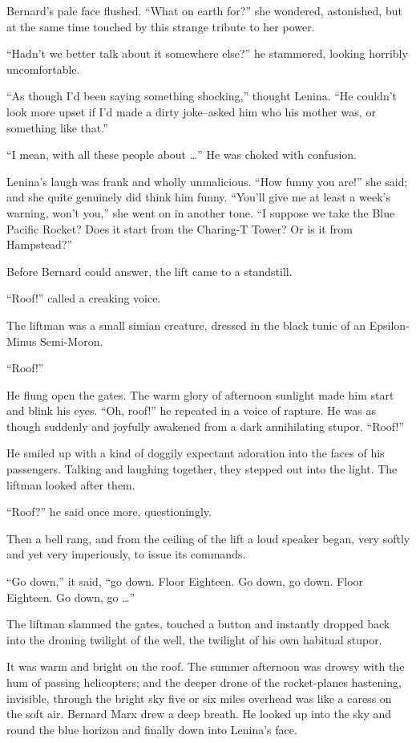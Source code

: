 \documentclass[12pt]{report}
\begin{document}
Bernard's pale face flushed. ``What on earth for?'' she wondered,
astonished, but at the same time touched by this strange tribute to her
power.

``Hadn't we better talk about it somewhere else?'' he stammered, looking
horribly uncomfortable.

``As though I'd been saying something shocking,'' thought Lenina. ``He
couldn't look more upset if I'd made a dirty joke--asked him who his
mother was, or something like that.''

``I mean, with all these people about \ldots{}'' He was choked with
confusion.

Lenina's laugh was frank and wholly unmalicious. ``How funny you are!''
she said; and she quite genuinely did think him funny. ``You'll give me
at least a week's warning, won't you,'' she went on in another tone. ``I
suppose we take the Blue Pacific Rocket? Does it start from the
Charing-T Tower? Or is it from Hampstead?''

Before Bernard could answer, the lift came to a standstill.

``Roof!'' called a creaking voice.

The liftman was a small simian creature, dressed in the black tunic of
an Epsilon-Minus Semi-Moron.

``Roof!''

He flung open the gates. The warm glory of afternoon sunlight made him
start and blink his eyes. ``Oh, roof!'' he repeated in a voice of
rapture. He was as though suddenly and joyfully awakened from a dark
annihilating stupor. ``Roof!''

He smiled up with a kind of doggily expectant adoration into the faces
of his passengers. Talking and laughing together, they stepped out into
the light. The liftman looked after them.

``Roof?'' he said once more, questioningly.

Then a bell rang, and from the ceiling of the lift a loud speaker began,
very softly and yet very imperiously, to issue its commands.

``Go down,'' it said, ``go down. Floor Eighteen. Go down, go down. Floor
Eighteen. Go down, go \ldots{}''

The liftman slammed the gates, touched a button and instantly dropped
back into the droning twilight of the well, the twilight of his own
habitual stupor.

It was warm and bright on the roof. The summer afternoon was drowsy with
the hum of passing helicopters; and the deeper drone of the
rocket-planes hastening, invisible, through the bright sky five or six
miles overhead was like a caress on the soft air. Bernard Marx drew a
deep breath. He looked up into the sky and round the blue horizon and
finally down into Lenina's face.
\end{document}
